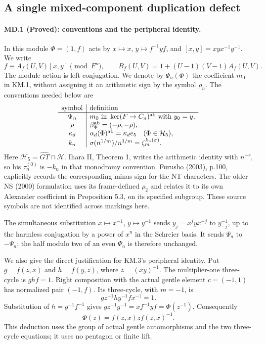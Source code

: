 \subsection*{A single mixed-component duplication defect}

\paragraph{MD.1 (Proved): conventions and the peripheral identity.}
In this module $\Phi=(1,f)$ acts by
$x\mapsto x$, $y\mapsto f^{-1}yf$, and
$[x,y]=xyx^{-1}y^{-1}$. We write
\[
 f\equiv A_f(U,V)[x,y]\pmod{F''},\qquad
 B_f(U,V)=1+(U-1)(V-1)A_f(U,V).
\]
The module action is left conjugation. We denote by $\Psi_n(\Phi)$
the coefficient $m_0$ in KM.1, without assigning it an arithmetic
sign by the symbol $\rho_n$. The conventions needed below are
\[
\begin{array}{c|l}
\text{symbol}&\text{definition}\\\hline
\Psi_n&m_0\text{ in }\ker(F\to C_n)^{\rm ab}\text{ with }y_0=y,\\
\rho&\beta_\Phi^{\rm ab}=(-\rho,-\rho),\\
\kappa_d&\alpha_d(\Phi)^{\rm ab}=\kappa_d e_5\quad(\Phi\in\mathcal H_5),\\
k_n&\sigma(n^{1/m})/n^{1/m}=\zeta_m^{k_n(\sigma)}.
\end{array}
\]
Here $\mathcal H_5=\widehat{GT}\cap\mathcal H$.
Ihara II, Theorem 1, writes the arithmetic identity with $n^{-r}$,
so his $\tau_n^{(0)}$ is $-k_n$ in that monodromy convention.
Furusho (2003), p.100, explicitly records the corresponding minus
sign for the NT characters. The older NS (2000) formulation uses
its frame-defined $\rho_2$ and relates it to its own Alexander
coefficient in Proposition 5.3, on its specified subgroup.
These source symbols are not identified across markings here.

The simultaneous substitution $x\mapsto x^{-1}$,
$y\mapsto y^{-1}$ sends $y_j=x^jyx^{-j}$ to $y_{-j}^{-1}$,
up to the harmless conjugation by a power of $x^n$ in the Schreier
basis. It sends $\Psi_n$ to $-\Psi_n$; the half modulo two of an
even $\Psi_n$ is therefore unchanged.

We also give the direct justification for KM.3's peripheral identity.
Put $g=f(z,x)$ and $h=f(y,z)$, where $z=(xy)^{-1}$. The
multiplier-one three-cycle is $ghf=1$. Right composition with the
actual gentle element $c=(-1,1)$ has normalized pair $(-1,f)$.
Its three-cycle, with $m=-1$, is
\[
 gz^{-1}hy^{-1}fx^{-1}=1.
\]
Substitution of $h=g^{-1}f^{-1}$ gives
$gz^{-1}g^{-1}=xf^{-1}yf=\Phi(z^{-1})$. Consequently
\[
 \Phi(z)=f(z,x)z f(z,x)^{-1}.
\]
This deduction uses the group of actual gentle automorphisms and
the two three-cycle equations; it uses no pentagon or finite lift.

